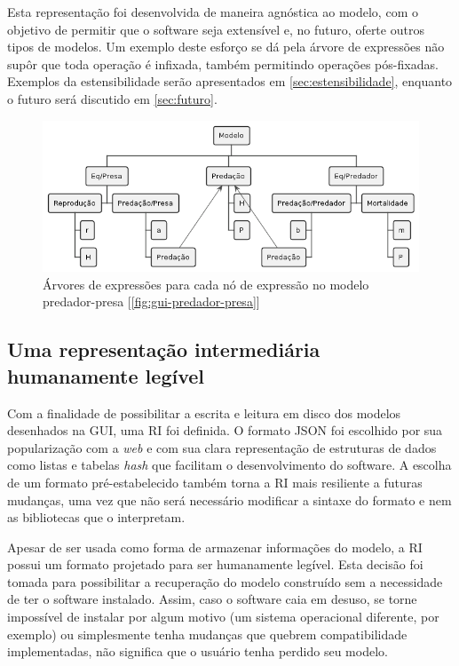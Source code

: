 \documentclass[
	12pt,				%
	openright,			%
	oneside,			%
	a4paper,			%
	main=brazil,
	english,			%
	]{ufsj-abntex2}
\begin{document}
Esta representação foi desenvolvida de maneira agnóstica ao modelo, com o objetivo de permitir que o software seja extensível e, no futuro, oferte outros tipos de modelos. Um exemplo deste esforço se dá pela árvore de expressões não supôr que toda operação é infixada, também permitindo operações pós-fixadas. Exemplos da estensibilidade serão apresentados em \ref{sec:estensibilidade}, enquanto o futuro será discutido em \ref{sec:futuro}.

\begin{figure}[h]
    \centering
    \includegraphics[scale=0.65]{diagrams/img/expr-tree.png} 
    \caption{Árvores de expressões para cada nó de expressão no modelo predador-presa [\ref{fig:gui-predador-presa}]}
    \label{fig:expr-tree}
\end{figure}

\subsection{Uma representação intermediária humanamente legível}
\label{subsection:RI}

Com a finalidade de possibilitar a escrita e leitura em disco dos modelos desenhados na GUI, uma RI foi definida. O formato JSON foi escolhido por sua popularização com a \textit{web} e com sua clara representação de estruturas de dados como listas e tabelas \textit{hash} que facilitam o desenvolvimento do software. A escolha de um formato pré-estabelecido também torna a RI mais resiliente a futuras mudanças, uma vez que não será necessário modificar a sintaxe do formato e nem as bibliotecas que o interpretam.

Apesar de ser usada como forma de armazenar informações do modelo, a RI possui um formato projetado para ser humanamente legível. Esta decisão foi tomada para possibilitar a recuperação do modelo construído sem a necessidade de ter o software instalado. Assim, caso o software caia em desuso, se torne impossível de instalar por algum motivo (um sistema operacional diferente, por exemplo) ou simplesmente tenha mudanças que quebrem compatibilidade implementadas, não significa que o usuário tenha perdido seu 
modelo.
\end{document}
